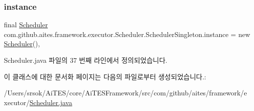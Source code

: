 \subsubsection{\texorpdfstring{instance}{instance}}
{\footnotesize\ttfamily final \mbox{\hyperlink{classcom_1_1github_1_1aites_1_1framework_1_1executor_1_1_scheduler}{Scheduler}} com.\+github.\+aites.\+framework.\+executor.\+Scheduler.\+Scheduler\+Singleton.\+instance = new \mbox{\hyperlink{classcom_1_1github_1_1aites_1_1framework_1_1executor_1_1_scheduler}{Scheduler}}()\hspace{0.3cm}{\ttfamily [static]}, {\ttfamily [private]}}



Scheduler.\+java 파일의 37 번째 라인에서 정의되었습니다.



이 클래스에 대한 문서화 페이지는 다음의 파일로부터 생성되었습니다.\+:\begin{DoxyCompactItemize}
\item 
/\+Users/srsok/\+Ai\+T\+E\+S/core/\+Ai\+T\+E\+S\+Framework/src/com/github/aites/framework/executor/\mbox{\hyperlink{_scheduler_8java}{Scheduler.\+java}}\end{DoxyCompactItemize}

